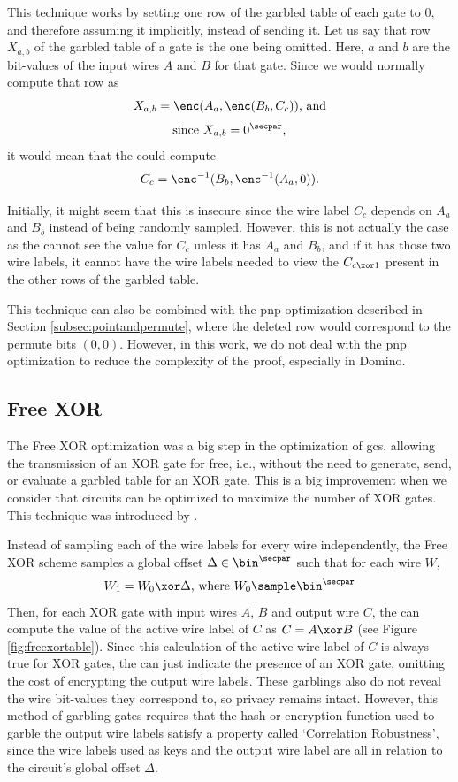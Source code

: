 This technique works by setting one row of the garbled table of each gate to 0, and therefore assuming it implicitly, instead of sending it. Let us say that row $X_{a,b}$ of the garbled table of a gate is the one being omitted. Here, $a$ and $b$ are the bit-values of the input wires $A$ and $B$ for that gate.
Since we would normally compute that row as 
\[X_{a,b} = \enc(A_a, \enc(B_b, C_c)) \text{, and}\]
\[ \text{since}\ X_{a,b} = 0^\secpar\text{,}\] 
it would mean that the \cevaluator could compute 
\[C_c = \enc^{-1}(B_b, \enc^{-1}(A_a, 0))\text{.}\]

Initially, it might seem that this is insecure since the wire label $C_c$ depends on $A_a$ and $B_b$ instead of being randomly sampled. However, this is not actually the case as the \cevaluator cannot see the value for $C_c$ unless it has $A_a$ and $B_b$, and if it has those two wire labels, it cannot have the wire labels needed to view the $C_{c\xor1}$ present in the other rows of the garbled table.

This technique can also be combined with the \acrfull{pnp} optimization described in Section \ref{subsec:pointandpermute}, where the deleted row would correspond to the permute bits $(0,0)$. However, in this work, we do not deal with the \acrlong{pnp} optimization to reduce the complexity of the proof, especially in Domino.

\subsection{Free XOR}
\label{subsec:freexor}


The Free XOR optimization was a big step in the optimization of \acrlong{gc}s, allowing the transmission of an XOR gate for free, i.e., without the need to generate, send, or evaluate a garbled table for an XOR gate. This is a big improvement when we consider that circuits can be optimized to maximize the number of XOR gates. This technique was introduced by \citeauthor{ALP:KolSch08} \cite{ALP:KolSch08}.


Instead of sampling each of the wire labels for every wire independently, the Free XOR scheme samples a global offset $\Delta \in \bin^\secpar$ such that for each wire $W$, \[W_1 = W_0\xor\Delta\text{, where $W_0 \sample\bin^\secpar$}\]
Then, for each XOR gate with input wires $A$, $B$ and output wire $C$, the \cevaluator can compute the value of the active wire label of $C$ as $C = A\xor B$ (see Figure \ref{fig:freexortable}).
Since this calculation of the active wire label of $C$ is always true for XOR gates, the \cgarbler can just indicate the presence of an XOR gate, omitting the cost of encrypting the output wire labels. These garblings also do not reveal the wire bit-values they correspond to, so privacy remains intact. However, this method of garbling gates requires that the hash or encryption function used to garble the output wire labels satisfy a property called `Correlation Robustness', since the wire labels used as keys and the output wire label are all in relation to the circuit's global offset $\Delta$.

